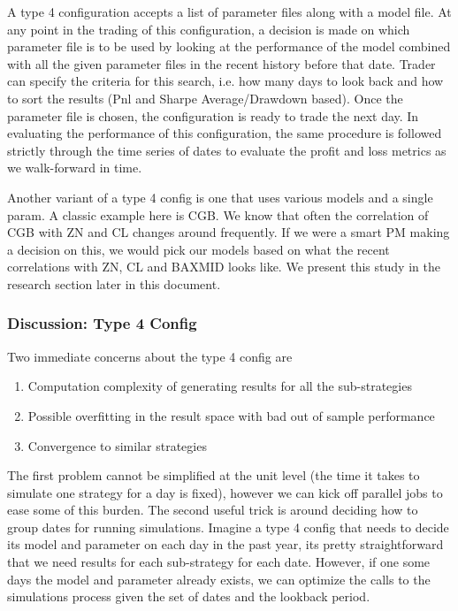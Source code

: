 \documentclass[a4paper]{article}
\begin{document}
A type 4 configuration accepts a list of parameter files along with a model file. At any point in the trading of this configuration, a decision is made on which parameter file is to be used by looking at the performance of the model combined with all the given parameter files in the recent history before that date. Trader can specify the criteria for this search, i.e. how many days to look back and how to sort the results (Pnl and Sharpe Average/Drawdown based). Once the parameter file is chosen, the configuration is ready to trade the next day. In evaluating the performance of this configuration, the same procedure is followed strictly through the time series of dates to evaluate the profit and loss metrics as we walk-forward in time.

Another variant of a type 4 config is one that uses various models and a single param. A classic example here is CGB. We know that often the correlation of CGB with ZN and CL changes around frequently. If we were a smart PM making a decision on this, we would pick our models based on 
what the recent correlations with ZN, CL and BAXMID looks like. We present this study in the research section later in this document.

\subsubsection{Discussion: Type 4 Config}
Two immediate concerns about the type 4 config are
\begin{enumerate}
\item Computation complexity of generating results for all the sub-strategies
\item Possible overfitting in the result space with bad out of sample performance
\item Convergence to similar strategies
\end{enumerate}
The first problem cannot be simplified at the unit level (the time it takes to simulate one strategy for a day is fixed), however we can kick off parallel jobs to ease some of this burden. The second useful trick is around deciding how to group dates for running simulations. Imagine a type 4 config that needs to decide its model and parameter on each day in the past year, its pretty straightforward that we need results for each sub-strategy for each date. However, if one some days the model and parameter already exists, we can optimize the calls to the simulations process given the set of dates and the lookback period.
\end{document}
